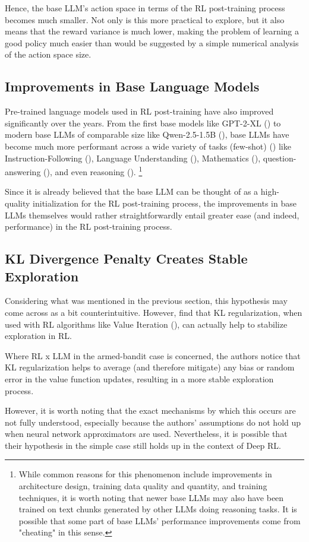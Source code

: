 \documentclass{article} %
\theoremstyle{definition}
\begin{document}
Hence, the base LLM's action space in terms of the RL post-training process
becomes much smaller. Not only is this more practical to explore, 
but it also means that the reward variance is much lower, making the problem of
learning a good policy much easier than would be suggested by a simple
numerical analysis of the action space size.

\subsection{Improvements in Base Language Models}

Pre-trained language models used in RL post-training
have also improved significantly over the years. From the first base models
like GPT-2-XL (\cite{Radford-et-al-2019}) to modern base LLMs of comparable size 
like Qwen-2.5-1.5B (\cite{Qwen-et-al-2025}), base LLMs have become
much more performant across a wide variety of tasks (few-shot) (\cite{open-llm-leaderboard-v2}) 
like Instruction-Following (\cite{IFEval, BBH}), Language Understanding (\cite{MMLU-Pro}),
Mathematics (\cite{MATH-5}), question-answering (\cite{GPQA, BBH}), and even 
reasoning (\cite{MATH-5, MuSR}).
\footnote{
    While common reasons for this phenomenon include improvements in
    architecture design, training data quality and quantity,
    and training techniques,
    it is worth noting that newer base LLMs may also have been trained on
    text chunks generated by other LLMs doing reasoning tasks.
    It is possible that some part of base LLMs' performance improvements
    come from "cheating" in this sense.
}

Since it is already believed that the base LLM can be thought of as 
a high-quality initialization for the RL post-training process,
the improvements in base LLMs themselves would
rather straightforwardly entail greater ease (and indeed, performance)
in the RL post-training process.

\subsection{KL Divergence Penalty Creates Stable Exploration}

Considering what was mentioned in the previous section,
this hypothesis may come across as a bit counterintuitive.
However, \cite{Vieillard-et-al-2020} find that KL regularization,
when used with RL algorithms like Value Iteration (\cite{Bellman-1957}),
can actually help to stabilize exploration in RL.

Where RL x LLM in the armed-bandit case is concerned, 
the authors notice that KL regularization helps to average (and therefore
mitigate) any bias or random error in the value function updates,
resulting in a more stable exploration process.

However, it is worth noting that the exact mechanisms by which this occurs 
are not fully understood, especially because the authors' assumptions do not hold up 
when neural network approximators are used.
Nevertheless, it is possible that
their hypothesis in the simple case still holds up in the context of Deep RL.



\end{document}

